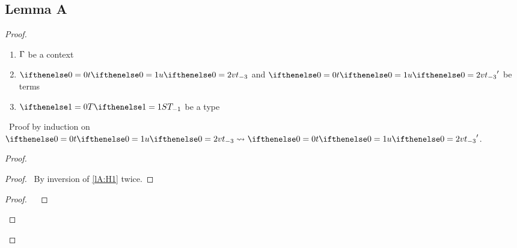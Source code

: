 \documentclass[a4paper]{article}
\begin{document}
\subsection{Lemma A}
\begin{proof}
    \pflet
    {\begin{enumerate}
        \item $\Gamma$ be a context
        \item $\aTerm$ and $\aTerm'$ be terms
        \item $\aType[1]$ be a type
    \end{enumerate}}
    \pfsketch\ Proof by induction on $\simplBeta \aTerm {\aTerm'}$.
    \begin{proof}
        \begin{proof}
            \pf\ By inversion of \ref{lA:H1} twice.
        \end{proof}
        \qedstep
        \begin{proof}
           \pf\ 
                    {\judge {\aContext}
                            {\subs{\aTerm[3]}{\envextend \envid \aVar \aBase}}
                            {\aType[1]}}
                    {}
        \end{proof}
    \end{proof}
\end{proof}
\end{document}
